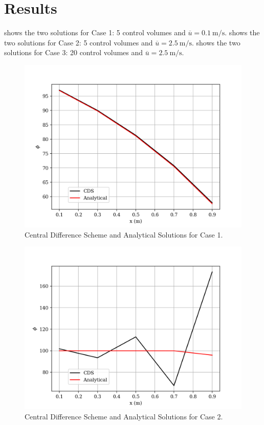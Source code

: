\documentclass[12pt]{article}
\begin{document}
\section{Results}
     shows the two solutions for Case 1: 5 control volumes and $\overline{u}=\SI{0.1}{\meter\per\second}$.
     shows the two solutions for Case 2: 5 control volumes and $\overline{u}=\SI{2.5}{\meter\per\second}$.
     shows the two solutions for Case 3: 20 control volumes and $\overline{u}=\SI{2.5}{\meter\per\second}$.
    \begin{figure}[htbp]
        \centering
        \includegraphics[width=\textwidth]{plots/graph_case1.png}
        \caption{Central Difference Scheme and Analytical Solutions for Case 1.}
        \label{fig:case1}
    \end{figure}

    
    \begin{figure}[htbp]
        \centering
        \includegraphics[width=\textwidth]{plots/graph_case2.png}
        \caption{Central Difference Scheme and Analytical Solutions for Case 2.}
        \label{fig:case2}
    \end{figure}
\end{document}

